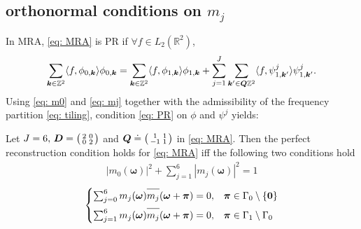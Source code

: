 \subsection{orthonormal conditions on $m_j$}\label{subsec: northonormal cond}
In MRA, \eqref{eq: MRA} is PR if $\forall f\in L_2(\mathbb{R}^2)$,
\begin{equation}
\sum_{\boldsymbol{k}\in\mathbb{Z}^2}\langle f,\phi_{0,\boldsymbol{k}}\rangle\phi_{0,\boldsymbol{k}} = \sum_{\boldsymbol{k}\in\mathbb{Z}^2}\langle f,\phi_{1,\boldsymbol{k}}\rangle\phi_{1,\boldsymbol{k}} + \sum_{j=1}^J\sum_{\boldsymbol{k}'\in\boldsymbol{Q}\mathbb{Z}^2}\langle f,\psi^{j}_{1,\boldsymbol{k}'}\rangle\psi^j_{1,\boldsymbol{k}'}.\label{eq: PR}
\end{equation}
Using \eqref{eq: m0} and \eqref{eq: mj} together with the admissibility of the frequency partition \eqref{eq: tiling}, condition \eqref{eq: PR} on $\phi$ and $\psi^j$ yields:
\begin{thm}\label{thm: conds}
Let $J=6,\, \boldsymbol{D} =\bigl(\begin{smallmatrix} 2&0\\0&2\end{smallmatrix}\bigr)$ and $\boldsymbol{Q}\doteq\bigl(\begin{smallmatrix} 1&1\\-1&1\end{smallmatrix}\bigr)$ in \eqref{eq: MRA}.
Then the perfect reconstruction condition holds for \eqref{eq: MRA} iff the following two conditions hold
\begin{align}\label{eq: id-sum}
|m_0(\boldsymbol{\omega})|^2 + \sum_{j = 1}^6|m_j(\boldsymbol{\omega})|^2 = 1
\end{align}
\begin{equation}\label{eq: shift-cancel}
 \begin{cases}
\sum_{j = 0}^6m_j(\boldsymbol{\omega})\overlinespace{m_j}(\boldsymbol{\omega} + \boldsymbol{\pi}) = 0, & \boldsymbol{\pi}\in \Gamma_0\setminus\{\boldsymbol{0}\}\\[.5em]
\sum_{j=1}^6m_j(\boldsymbol{\omega})\overlinespace{m_j}(\boldsymbol{\omega}+\boldsymbol{\pi}) = 0, & \boldsymbol{\pi}\in\Gamma_1\setminus\Gamma_0
\end{cases}
\end{equation}
\end{thm}

